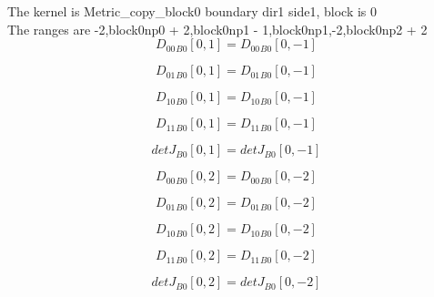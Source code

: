 \documentclass{article}
\begin{document}
\noindent The kernel is Metric_copy_block0 boundary dir1 side1, block is 0\\\noindent The ranges are -2,block0np0 + 2,block0np1 - 1,block0np1,-2,block0np2 + 2\\\begin{dmath}{D_{00}{_{B0}}}[{0,1}] = {D_{00}{_{B0}}}[{0,-1}]\end{dmath}

\begin{dmath}{D_{01}{_{B0}}}[{0,1}] = {D_{01}{_{B0}}}[{0,-1}]\end{dmath}

\begin{dmath}{D_{10}{_{B0}}}[{0,1}] = {D_{10}{_{B0}}}[{0,-1}]\end{dmath}

\begin{dmath}{D_{11}{_{B0}}}[{0,1}] = {D_{11}{_{B0}}}[{0,-1}]\end{dmath}

\begin{dmath}{detJ{_{B0}}}[{0,1}] = {detJ{_{B0}}}[{0,-1}]\end{dmath}

\begin{dmath}{D_{00}{_{B0}}}[{0,2}] = {D_{00}{_{B0}}}[{0,-2}]\end{dmath}

\begin{dmath}{D_{01}{_{B0}}}[{0,2}] = {D_{01}{_{B0}}}[{0,-2}]\end{dmath}

\begin{dmath}{D_{10}{_{B0}}}[{0,2}] = {D_{10}{_{B0}}}[{0,-2}]\end{dmath}

\begin{dmath}{D_{11}{_{B0}}}[{0,2}] = {D_{11}{_{B0}}}[{0,-2}]\end{dmath}

\begin{dmath}{detJ{_{B0}}}[{0,2}] = {detJ{_{B0}}}[{0,-2}]\end{dmath}
\end{document}
